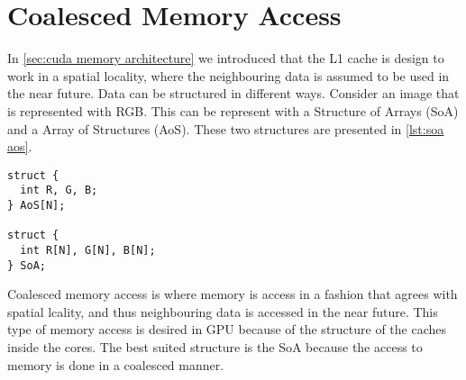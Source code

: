 \section{Coalesced Memory Access}
\label{sec:coalesced}

In \cref{sec:cuda memory architecture} we introduced that the L1 cache is design to work in a spatial locality, where the neighbouring data is assumed to be used in the near future.
Data can be structured in different ways.
Consider an image that is represented with RGB.
This can be represent with a Structure of Arrays (SoA) and a Array of Structures (AoS).
These two structures are presented in \cref{lst:soa aos}.

\begin{lstlisting}[caption={Example of SoA and AoS with RGB}, label={lst:soa aos}]
struct {
  int R, G, B;
} AoS[N];

struct {
  int R[N], G[N], B[N];
} SoA;
\end{lstlisting}

Coalesced memory access is where memory is access in a fashion that agrees with spatial lcality, and thus neighbouring data is accessed in the near future.
This type of memory access is desired in GPU because of the structure of the caches inside the cores.
The best suited structure is the SoA because the access to memory is done in a coalesced manner.
